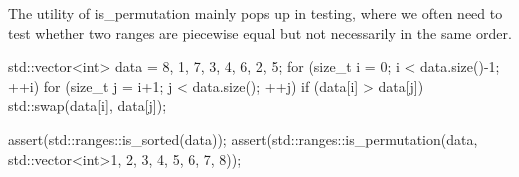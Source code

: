 The utility of is\_permutation mainly pops up in testing, where we often need to test whether two ranges are piecewise equal but not necessarily in the same order.

\begin{box-note}
\begin{cppcode}
std::vector<int> data = { 8, 1, 7, 3, 4, 6, 2, 5};
for (size_t i = 0; i < data.size()-1; ++i)
    for (size_t j = i+1; j < data.size(); ++j)
        if (data[i] > data[j])
            std::swap(data[i], data[j]);

assert(std::ranges::is_sorted(data));
assert(std::ranges::is_permutation(data, 
                                   std::vector<int>{1, 2, 3, 4, 5, 6, 7, 8}));
\end{cppcode}
\end{box-note}